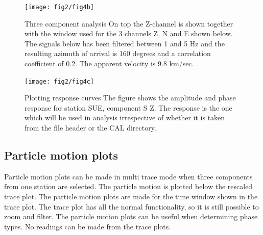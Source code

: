 \begin{figure}
\centerline{\texttt{[image: fig2/fig4b]}}
\caption{Three component analysis\newline
On top the Z-channel is shown together with the window used for the 
3 channels Z, N and E shown below. The signals below has been filtered 
between 1 and 5 Hz and the resulting azimuth of arrival is 160 degrees 
and a correlation coefficient of 0.2. The apparent velocity is 9.8 km/sec.}
\label{fig:mulplt-3comp}
\end{figure}

\begin{figure}
\centerline{\texttt{[image: fig2/fig4c]}}
\caption{Plotting response curves\newline
The figure shows the amplitude and phase response for station SUE, 
component S Z. The response is the one which will be used in analysis 
irrespective of whether it is taken from the file header or the CAL directory.}
\label{fig:mulplt-resp}
\end{figure}

\subsection{Particle motion plots}

Particle motion plots can be made in multi trace mode when three components from one station are selected. The particle motion is plotted below the rescaled trace plot. The particle motion plots are made for the time window shown in the trace plot. The trace plot has all the normal functionality, so it is still possible to zoom and filter. The particle motion plots can be useful when determining phase types. No readings can be made from the trace plots. 

